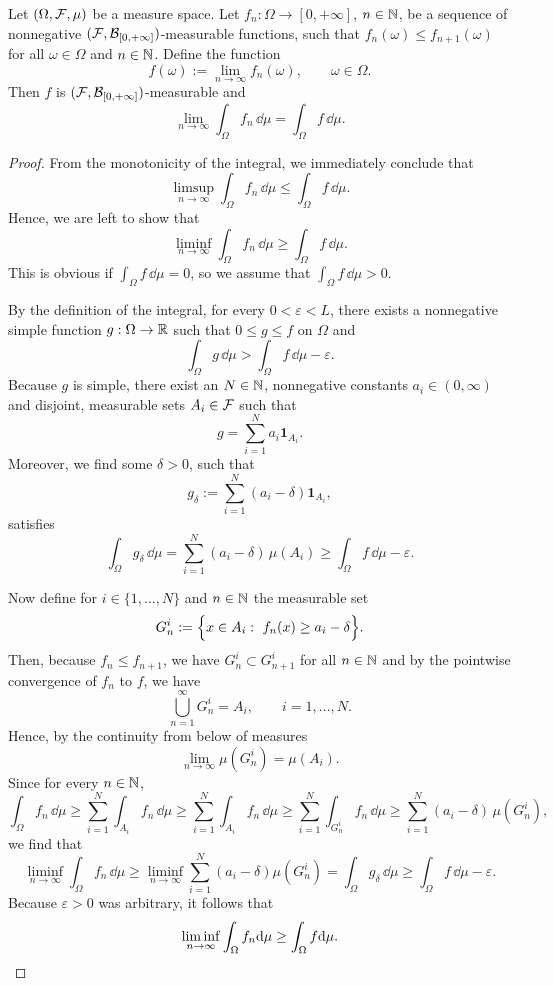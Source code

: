 \begin{theorem}
	\label{th:monotone-convergence-I}
	Let $(\Omega, \mathcal F, \mu)$ be a measure space. Let $f_n\colon\Omega \to [0,+\infty]$, $n \in \mathbb N$, be a sequence of nonnegative $(\mathcal F,\mathcal B_{[0,+\infty]})$-measurable functions, such that $f_n(\omega) \leq f_{n+1}(\omega)$ for all $\omega \in \Omega$ and $n \in \mathbb N$. Define the function 
	\[
		f(\omega) := \lim_{n \to \infty} f_n(\omega),\qquad \omega\in\Omega.
	\]
	Then $f$ is $(\mathcal F,\mathcal B_{[0,+\infty]})$-measurable and
	\[
	\lim_{n \to \infty} \int_\Omega f_n\, \dd \mu = \int_\Omega f\, \dd \mu.
	\]
\end{theorem}

\begin{proof}
	From the monotonicity of the integral, we immediately conclude that
	\[
	\limsup_{n \to \infty} \int_\Omega f_n\, \dd \mu \leq \int_\Omega f\, \dd \mu.
	\]
	Hence, we are left to show that
	\[
	\liminf_{n \to \infty } \int_\Omega f_n\, \dd \mu \geq \int_\Omega f\, \dd \mu.
	\]
	This is obvious if $\int_\Omega f\, \dd \mu = 0$, so we assume that $\int_\Omega f\, \dd \mu >0$.
	
	By the definition of the integral, for every $0<\varepsilon<L$, there exists a nonnegative simple function $g: \Omega \to \mathbb R$ such that $0\le g \leq f$ on $\Omega$ and
	\[
		\int_\Omega g\, \dd \mu > \int_\Omega f\, \dd \mu - \varepsilon.
	\]
	Because $g$ is simple, there exist an $N \in \mathbb N$, nonnegative constants $a_i \in (0,\infty)$ and disjoint, measurable sets $A_i \in \mathcal F$ such that
	\[
		g = \sum_{i=1}^N a_i \mathbf{1}_{A_i}.
	\]
	Moreover, we find some $\delta>0$, such that
	\[
		g_\delta:= \sum_{i=1}^N (a_i-\delta)\mathbf{1}_{A_i}, 
	\]
	satisfies
	\[
		\int_\Omega g_\delta\,\dd \mu = \sum_{i=1}^N(a_i-\delta)\,\mu(A_i) \ge \int_\Omega f\,\dd\mu - \varepsilon. 
	\]
	
	Now define for $i \in \{ 1, \dots, N\}$ and $n \in \mathbb N$ the measurable set
	\[
	G_n^i := \Bigl\{ x \in A_i : \ f_n(x) \geq a_i - \delta \Bigr\}.
	\]
	Then, because $f_n \leq f_{n+1}$, we have $G_n^i \subset G_{n+1}^i$ for all $n \in \mathbb N$ and by the pointwise convergence of $f_n$ to $f$, we have
	\[
	\bigcup_{n=1}^\infty G_n^i = A_i,\qquad i=1,\ldots,N.
	\]
	Hence, by the continuity from below of measures
	\[
		\lim_{n \to \infty}\mu(G_n^i) = \mu(A_i).
	\]
	Since for every $n\in\mathbb N$,
		\[
		\int_\Omega f_n\,\dd\mu \ge \sum_{i=1}^N \int_{A_i} f_n\,\dd \mu \ge \sum_{i=1}^N \int_{A_i} f_n\,\dd \mu \ge \sum_{i=1}^N \int_{G_n^i} f_n\,\dd \mu \ge \sum_{i=1}^N (a_i-\delta)\,\mu(G_n^i),
	\]
	we find that
	\[
		\liminf_{n \to \infty} \int_\Omega f_n\, \dd \mu \ge  \liminf_{n \to \infty } \sum_{i=1}^N (a_i - \delta) \mu(G_n^i) = \int_\Omega g_\delta\,\dd\mu \ge \int_\Omega f\,\dd\mu - \varepsilon. 
	\]
	Because $\varepsilon>0$ was arbitrary, it follows that
	\[
	\liminf_{n \to \infty} \int_\Omega f_n \mathrm{d} \mu \geq \int_\Omega f \mathrm{d} \mu.\qedhere
	\]	
\end{proof}




